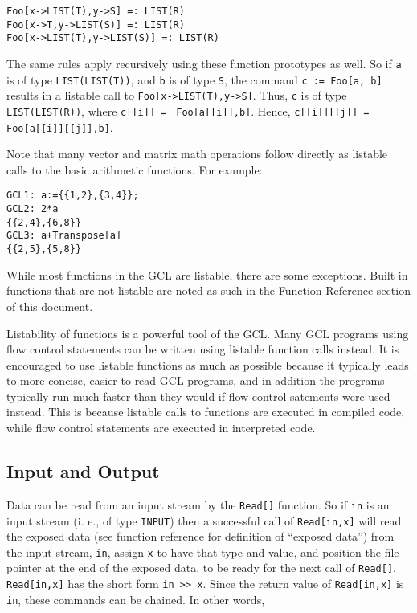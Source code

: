 \begin{verbatim}
Foo[x->LIST(T),y->S] =: LIST(R)
Foo[x->T,y->LIST(S)] =: LIST(R)
Foo[x->LIST(T),y->LIST(S)] =: LIST(R)
\end{verbatim}

The same rules apply recursively using these function prototypes as
well.  So if \verb+a+ is of type \verb+LIST(LIST(T))+, and \verb+b+ is
of type \verb+S+, the command \verb+c := Foo[a, b]+ results in
a listable call to \verb+Foo[x->LIST(T),y->S]+.  Thus, \verb+c+ is of
type \verb+LIST(LIST(R))+, where \verb+c[[i]] = +
\verb+Foo[a[[i]],b]+.  Hence, \verb+c[[i]][[j]] = +
\verb+Foo[a[[i]][[j]],b]+.

Note that many vector and matrix math operations follow directly as
listable calls to the basic arithmetic functions.  For example:

\begin{verbatim}
GCL1: a:={{1,2},{3,4}};
GCL2: 2*a
{{2,4},{6,8}}
GCL3: a+Transpose[a]
{{2,5},{5,8}}
\end{verbatim}

While most functions in the GCL are listable, there are some
exceptions.  Built in functions that are not listable are noted as
such in the Function Reference section of this document.  

Listability of functions is a powerful tool of the GCL. Many GCL
programs using flow control statements can be written using listable
function calls instead.  It is encouraged to use listable functions as
much as possible because it typically leads to more concise, easier to
read GCL programs, and in addition the programs typically run much
faster than they would if flow control satements were used instead.
This is because listable calls to functions are executed in compiled
code, while flow control statements are executed in interpreted code.

\subsection{Input and Output}

Data can be read from an input stream by the \verb+Read[]+ function.
So if \verb+in+ is an input stream (i. e., of type \verb+INPUT+) then a
successful call of \verb+Read[in,x]+ will read the exposed data (see
function reference for definition of ``exposed data'') from the input
stream, \verb+in+, assign \verb+x+ to have that type and value, and
position the file pointer at the end of the exposed data, to be ready
for the next call of \verb+Read[]+.  \verb+Read[in,x]+ has the short form
\verb+in >> x+.  Since the return value of \verb+Read[in,x]+ is
\verb+in+, these commands can be chained.  In other words,

